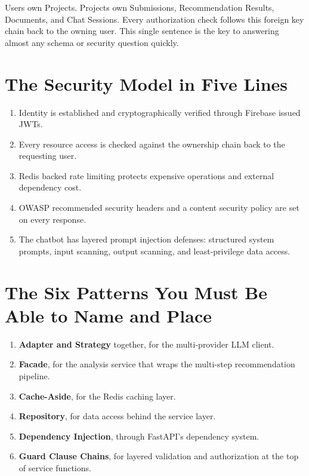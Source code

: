 \documentclass[11pt,a4paper]{report}
\begin{document}
Users own Projects. Projects own Submissions, Recommendation Results, Documents, and Chat Sessions. Every authorization check follows this foreign key chain back to the owning user. This single sentence is the key to answering almost any schema or security question quickly.

\section{The Security Model in Five Lines}

\begin{enumerate}[leftmargin=*]
\item Identity is established and cryptographically verified through Firebase issued JWTs.
\item Every resource access is checked against the ownership chain back to the requesting user.
\item Redis backed rate limiting protects expensive operations and external dependency cost.
\item OWASP recommended security headers and a content security policy are set on every response.
\item The chatbot has layered prompt injection defenses: structured system prompts, input scanning, output scanning, and least-privilege data access.
\end{enumerate}

\section{The Six Patterns You Must Be Able to Name and Place}

\begin{enumerate}[leftmargin=*]
\item \textbf{Adapter and Strategy} together, for the multi-provider LLM client.
\item \textbf{Facade}, for the analysis service that wraps the multi-step recommendation pipeline.
\item \textbf{Cache-Aside}, for the Redis caching layer.
\item \textbf{Repository}, for data access behind the service layer.
\item \textbf{Dependency Injection}, through FastAPI's dependency system.
\item \textbf{Guard Clause Chains}, for layered validation and authorization at the top of service functions.
\end{enumerate}
\end{document}
